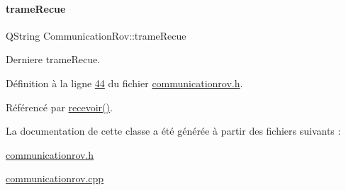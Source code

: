 \mbox{\label{class_communication_rov_a2f5a49875a9fa51800522c531ecc65fc}} 
\paragraph{\texorpdfstring{trame\+Recue}{trameRecue}}
{\footnotesize\ttfamily Q\+String Communication\+Rov\+::trame\+Recue\hspace{0.3cm}{\ttfamily [private]}}



Derniere trame\+Recue. 



Définition à la ligne \hyperlink{communicationrov_8h_source_l00044}{44} du fichier \hyperlink{communicationrov_8h_source}{communicationrov.\+h}.



Référencé par \hyperlink{communicationrov_8cpp_source_l00073}{recevoir()}.



La documentation de cette classe a été générée à partir des fichiers suivants \+:\begin{DoxyCompactItemize}
\item 
\hyperlink{communicationrov_8h}{communicationrov.\+h}\item 
\hyperlink{communicationrov_8cpp}{communicationrov.\+cpp}\end{DoxyCompactItemize}
